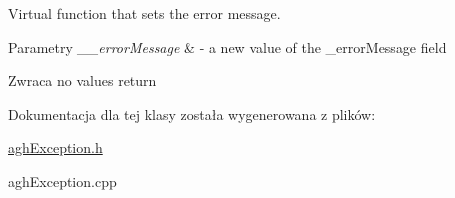 Virtual function that sets the error message. 


\begin{DoxyParams}{Parametry}
{\em \-\_\-\-\_\-error\-Message} & -\/ a new value of the \-\_\-error\-Message field \\
\hline
\end{DoxyParams}
\begin{DoxyReturn}{Zwraca}
no values return 
\end{DoxyReturn}


Dokumentacja dla tej klasy została wygenerowana z plików\-:\begin{DoxyCompactItemize}
\item 
\hyperlink{aghException_8h}{agh\-Exception.\-h}\item 
agh\-Exception.\-cpp\end{DoxyCompactItemize}
